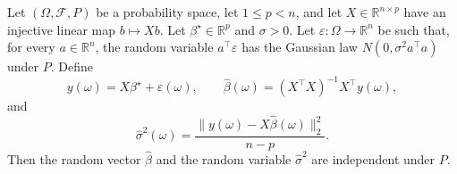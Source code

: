 \begin{theorem}
Let $(\Omega,\mathcal F,P)$ be a probability space, let $1\le p<n$, and
let $X\in\mathbb R^{n\times p}$ have an injective linear map
$b\mapsto Xb$.  Let $\beta^\star\in\mathbb R^p$ and $\sigma>0$.  Let
$\varepsilon:\Omega\to\mathbb R^n$ be such that, for every
$a\in\mathbb R^n$, the random variable $a^\top\varepsilon$ has the
Gaussian law $N(0,\sigma^2a^\top a)$ under $P$.  Define
\[
  y(\omega)=X\beta^\star+\varepsilon(\omega),
  \qquad
  \widehat\beta(\omega)=(X^\top X)^{-1}X^\top y(\omega),
\]
and
\[
  \widehat\sigma^2(\omega)
  =\frac{\|y(\omega)-X\widehat\beta(\omega)\|_2^2}{n-p}.
\]
Then the random vector $\widehat\beta$ and the random variable
$\widehat\sigma^2$ are independent under $P$.
\end{theorem}
